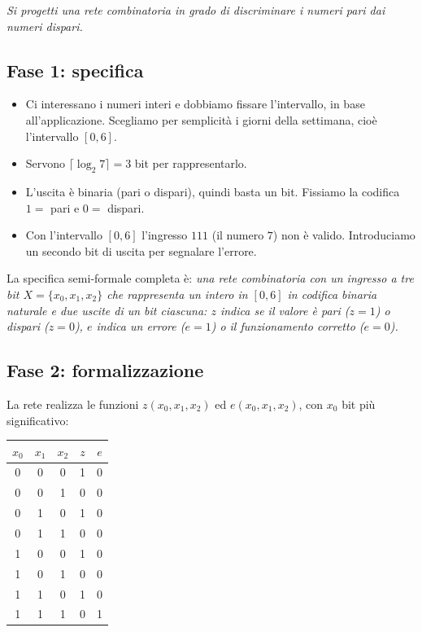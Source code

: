 \documentclass[11pt,a4paper]{article}
\begin{document}
\emph{Si progetti una rete combinatoria in grado di discriminare i numeri pari dai numeri dispari.}

\subsection*{Fase 1: specifica}

\begin{itemize}
    \item Ci interessano i numeri interi e dobbiamo fissare l'intervallo, in base all'applicazione. Scegliamo per semplicità i giorni della settimana, cioè l'intervallo $[0, 6]$.
    \item Servono $\lceil \log_2 7 \rceil = 3$ bit per rappresentarlo.
    \item L'uscita è binaria (pari o dispari), quindi basta un bit. Fissiamo la codifica $1 = $ pari e $0 = $ dispari.
    \item Con l'intervallo $[0,6]$ l'ingresso $111$ (il numero $7$) non è valido. Introduciamo un secondo bit di uscita per segnalare l'errore.
\end{itemize}

La specifica semi-formale completa è: \emph{una rete combinatoria con un ingresso a tre bit $X = \{x_0, x_1, x_2\}$ che rappresenta un intero in $[0,6]$ in codifica binaria naturale e due uscite di un bit ciascuna: $z$ indica se il valore è pari ($z = 1$) o dispari ($z = 0$), $e$ indica un errore ($e = 1$) o il funzionamento corretto ($e = 0$).}

\subsection*{Fase 2: formalizzazione}

La rete realizza le funzioni $z(x_0,x_1,x_2)$ ed $e(x_0,x_1,x_2)$, con $x_0$ bit più significativo:
\begin{center}
\begin{tabular}{ccc|cc}
\toprule
$x_0$ & $x_1$ & $x_2$ & $z$ & $e$ \\
\midrule
0 & 0 & 0 & 1 & 0 \\
0 & 0 & 1 & 0 & 0 \\
0 & 1 & 0 & 1 & 0 \\
0 & 1 & 1 & 0 & 0 \\
1 & 0 & 0 & 1 & 0 \\
1 & 0 & 1 & 0 & 0 \\
1 & 1 & 0 & 1 & 0 \\
1 & 1 & 1 & 0 & 1 \\
\bottomrule
\end{tabular}
\end{center}
\end{document}
